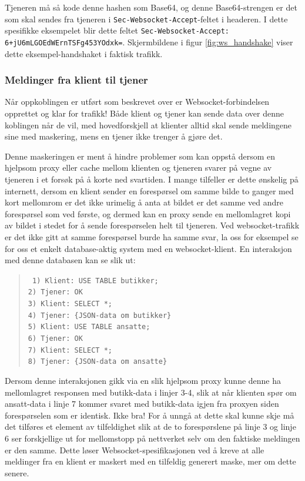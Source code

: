 \documentclass{article}
\newcommand{\code}[1]{\colorbox{light-gray}{\texttt{#1}}}
\begin{document}
Tjeneren må så kode denne hashen som Base64, og denne Base64-strengen er det som skal sendes fra tjeneren i \code{Sec-Websocket-Accept}-feltet i headeren. I dette spesifikke eksempelet blir dette feltet \code{Sec-Websocket-Accept: 6+jU6mLGOEdWErnTSFg453YOdxk=}. Skjermbildene i figur \ref{fig:ws_handshake} viser dette eksempel-handshaket i faktisk trafikk.

\subsubsection{Meldinger fra klient til tjener}

Når oppkoblingen er utført som beskrevet over er Websocket-forbindelsen opprettet og klar for trafikk! Både klient og tjener kan sende data over denne koblingen når de vil, med hovedforskjell at klienter alltid skal sende meldingene sine med maskering, mens en tjener ikke trenger å gjøre det.

Denne maskeringen er ment å hindre problemer som kan oppstå dersom en hjelpsom proxy eller cache mellom klienten og tjeneren svarer på vegne av tjeneren i et forsøk på å korte ned svartiden. I mange tilfeller er dette ønskelig på internett, dersom en klient sender en forespørsel om samme bilde to ganger med kort mellomrom er det ikke urimelig å anta at bildet er det samme ved andre forespørsel som ved første, og dermed kan en proxy sende en mellomlagret kopi av bildet i stedet for å sende forespørselen helt til tjeneren.
Ved websocket-trafikk er det ikke gitt at samme forespørsel burde ha samme svar, la oss for eksempel se for oss et enkelt database-aktig system med en websocket-klient. En interaksjon med denne databasen kan se slik ut:

\begin{quote}
\tt
    1) Klient: USE TABLE butikker; \\
    2) Tjener: OK \\
    3) Klient: SELECT *; \\
    4) Tjener: \{JSON-data om butikker\} \\
    5) Klient: USE TABLE ansatte; \\
    6) Tjener: OK \\
    7) Klient: SELECT *; \\
    8) Tjener: \{JSON-data om ansatte\} \\
\end{quote}

Dersom denne interaksjonen gikk via en slik hjelpsom proxy kunne denne ha mellomlagret responsen med butikk-data i linjer 3-4, slik at når klienten spør om ansatt-data i linje 7 kommer svaret med butikk-data igjen fra proxyen siden forespørselen som er identisk. Ikke bra! For å unngå at dette skal kunne skje må det tilføres et element av tilfeldighet slik at de to forespørslene på linje 3 og linje 6 ser forskjellige ut for mellomstopp på nettverket selv om den faktiske meldingen er den samme. Dette løser Websocket-spesifikasjonen ved å kreve at alle meldinger fra en klient er maskert med en tilfeldig generert maske, mer om dette senere.
\end{document}
